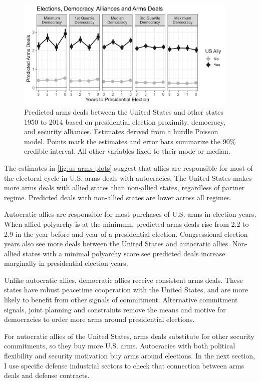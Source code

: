\documentclass[12pt]{article}
\begin{document}
\begin{figure}[htpb]
	\centering
		\includegraphics[width=0.95\textwidth]{../figures/us-arms-plots.png}
	\caption{Predicted arms deals between the United States and other states 1950 to 2014 based on presidential election proximity, democracy, and security alliances. Estimates derived from a hurdle Poisson model. Points mark the estimates and error bars summarize the 90\% credible interval. All other variables fixed to their mode or median.}
	\label{fig:us-arms-plots}
\end{figure}


The estimates in \autoref{fig:us-arms-plots} suggest that allies are responsible for most of the electoral cycle in U.S. arms deals with autocracies. 
The United States makes more arms deals with allied states than non-allied states, regardless of partner regime. 
Predicted deals with non-allied states are lower across all regimes. 


Autocratic allies are responsible for most purchases of U.S. arms in election years. 
When allied polyarchy is at the minimum, predicted arms deals rise from 2.2 to 2.9 in the year before and year of a presidential election. 
Congressional election years also see more deals between the United States and autocratic allies. 
Non-allied states with a minimal polyarchy score see predicted deals increase marginally in presidential election years.


Unlike autocratic allies, democratic allies receive consistent arms deals. 
These states have robust peacetime cooperation with the United States, and are more likely to benefit from other signals of commitment.
Alternative commitment signals, joint planning and constraints remove the means and motive for democracies to order more arms around presidential elections.


For autocratic allies of the United States, arms deals substitute for other security commitments, so they buy more U.S. arms. 
Autocracies with both political flexibility and security motivation buy arms around elections. 
In the next section, I use specific defense industrial sectors to check that connection between arms deals and defense contracts. 
\end{document}
